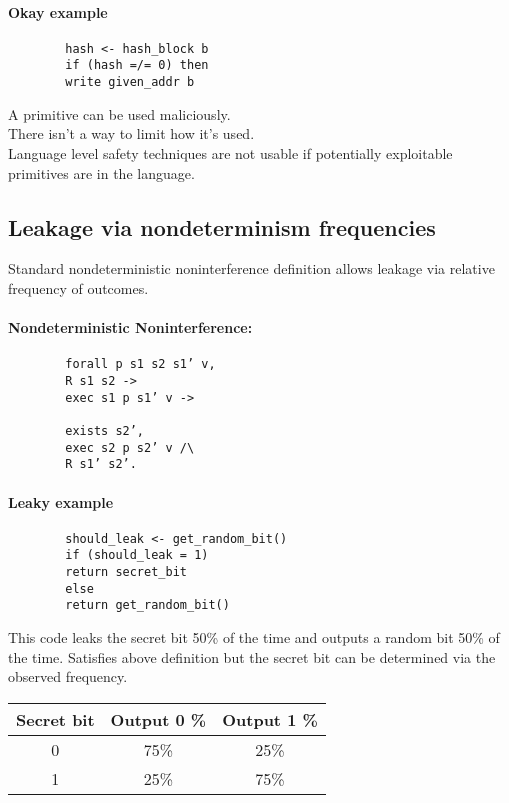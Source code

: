 \documentclass[onecolumn]{paper}
\begin{document}
	\paragraph*{Okay example}
	\begin{verbatim}
		hash <- hash_block b
		if (hash =/= 0) then
		write given_addr b
	\end{verbatim}

	A primitive can be used maliciously.\\
	There isn’t a way to limit how it’s used.\\
	Language level safety techniques are not usable if potentially exploitable primitives are in the language.

	\subsection{Leakage via nondeterminism frequencies}	
	Standard nondeterministic noninterference definition allows leakage via relative frequency of outcomes.
	\paragraph{Nondeterministic Noninterference:}
	
	\begin{verbatim}
		forall p s1 s2 s1’ v,
		R s1 s2 ->
		exec s1 p s1’ v ->
		
		exists s2’,
		exec s2 p s2’ v /\
		R s1’ s2’.
	\end{verbatim} 
	
	
	
	\paragraph*{Leaky example}
	\begin{verbatim}
		should_leak <- get_random_bit()
		if (should_leak = 1)
		return secret_bit
		else
		return get_random_bit()
	\end{verbatim}
	
	This code leaks the secret bit 50\% of the time and outputs a random bit 50\% of the time.
	Satisfies above definition but the secret bit can be determined via the observed frequency.
	
	\begin{tabular}{| c | c | c |}
		\hline
		Secret bit & Output 0 \% & Output 1 \% \\
		\hline
		0 &	75\% & 25\% \\
		\hline
		1 &	25\% & 75\% \\
		\hline
		\end{tabular}
	
\end{document}
